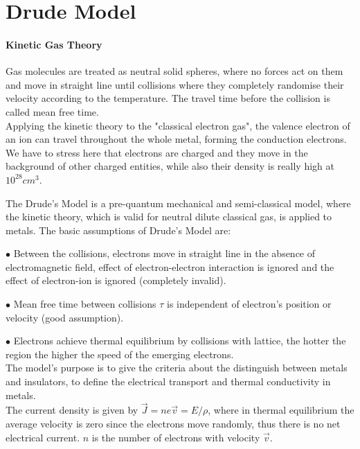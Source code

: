 \documentclass[openany,11pt,a4paper]{report}
\begin{document}
\section{Drude Model\cite{drude}}


\paragraph{Kinetic Gas Theory}

Gas molecules are treated as neutral solid spheres, where no forces act on them and move in straight line until collisions where they completely randomise their velocity according to the temperature. The travel time before the collision is called mean free time.\\

Applying the kinetic theory to the "classical electron gas", the valence electron of an ion can travel throughout the whole metal, forming the conduction electrons. We have to stress here that electrons are charged and they move in the background of other charged entities, while also their density is really high at $10^{28}cm^{3}$. 

The Drude's Model is a pre-quantum mechanical and semi-classical model, where the kinetic theory, which is valid for neutral dilute classical gas, is applied to metals. The basic assumptions of Drude's Model are:

$\bullet $ Between the collisions, electrons move in straight line in the absence of electromagnetic field, effect of electron-electron interaction is ignored and the effect of electron-ion is ignored (completely invalid).


$\bullet $ Mean free time between collisions $\tau$ is independent of electron's position or velocity (good assumption).


$\bullet $ Electrons achieve thermal equilibrium by collisions with lattice, the hotter the region the higher the speed of the emerging electrons.\\

The model's purpose is to give the criteria about the distinguish between metals and insulators, to define the  electrical transport and thermal conductivity in metals.\\

The current density is given by $ \vec{J}=ne\vec{v}=E/\rho$, where in thermal equilibrium the average velocity is zero since the electrons move randomly, thus there is no net electrical current. $n$ is the number of electrons with velocity $\vec{v}$.\
\end{document}
